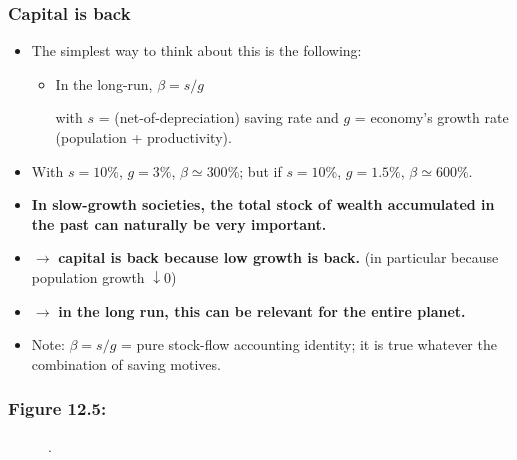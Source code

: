 \documentclass[t]{beamer}\usepackage[]{graphicx}\usepackage[]{color}
\begin{document}
\begin{frame}[label=CapitalIsBack]
\frametitle{Capital is back}
\begin{itemize}
\item
The simplest way to think about this is the following: 
\begin{itemize}
\item
In the long-run, $\beta = s/g$
\par\medskip
with $s$ = (net-of-depreciation) saving rate and $g$ = economy's growth rate (population + productivity).
\end{itemize}
\item
With $s = 10\%$, $g = 3\%$, $\beta \simeq 300\%$; but if $s = 10\%$, $g = 1.5\%$, $\beta \simeq 600\%$.
\item
\textbf{In slow-growth societies, the total stock of wealth accumulated in the past can naturally be very important.}
\item
$\rightarrow$ \textbf{capital is back because low growth is back.}
(in particular because population growth $\downarrow 0$)
\item
$\rightarrow$ \textbf{in the long run, this can be relevant for the entire planet.}
\item
Note: $\beta = s/g$ = pure stock-flow accounting identity; it is true whatever the combination of saving motives.
\end{itemize}
\end{frame}


\begin{frame}[label=Figure_12_5]
\frametitle{Figure 12.5: }
\begin{figure}[t]
\begin{minipage}[b]{\textwidth}
\centering

\caption{.}
\end{minipage}
\end{figure}
\end{frame}
\end{document}
